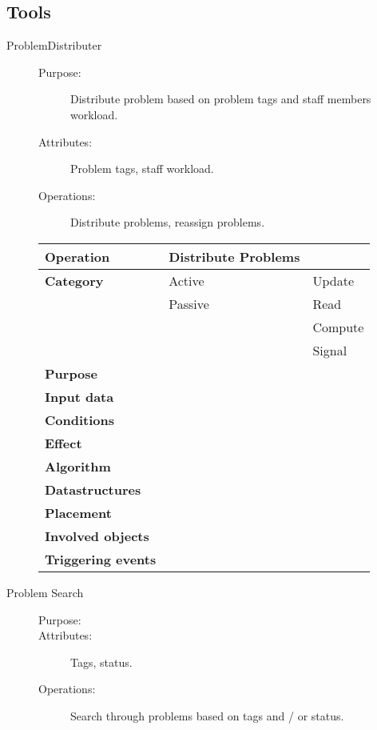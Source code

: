 \subsection{Tools}

\begin{description}
\item[ProblemDistributer]\hfill
\begin{description}
\item[Purpose:]Distribute problem based on problem tags and staff members workload.
\item[Attributes:]Problem tags, staff workload.
\item[Operations:]Distribute problems, reassign problems.
\end{description}
\end{description}

\begin{figure}
\begin{tabular}{p{3.5cm} p{4cm} p{4cm}}
\hline
\textbf{Operation}&Distribute Problems\\
\hline
\textbf{Category}&\underline{ }Active&\underline{ }Update\\
&\underline{ }Passive&\underline{ }Read\\
&&\underline{ }Compute\\
&&\underline{ }Signal\\
\textbf{Purpose}&\multicolumn{2}{p{8cm}}{}\\
\textbf{Input data}&\multicolumn{2}{p{8cm}}{}\\
\textbf{Conditions}&\multicolumn{2}{p{8cm}}{}\\
\textbf{Effect}&\multicolumn{2}{p{8cm}}{}\\
\textbf{Algorithm}&\multicolumn{2}{p{8cm}}{}\\
\textbf{Datastructures}&\multicolumn{2}{p{8cm}}{}\\
\textbf{Placement}&\multicolumn{2}{p{8cm}}{}\\
\textbf{Involved objects}&\multicolumn{2}{p{8cm}}{}\\
\textbf{Triggering events}&\multicolumn{2}{p{8cm}}{}\\
\hline
\end{tabular}
\end{figure}

\begin{description}
\item[Problem Search]\hfill
\begin{description}
\item[Purpose:]
\item[Attributes:]Tags, status.
\item[Operations:]Search through problems based on tags and / or status.
\end{description}
\end{description}

